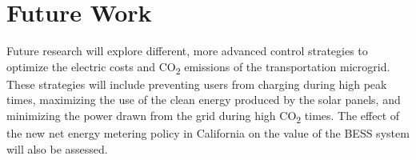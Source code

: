 \documentclass[conference]{IEEEtran}
\begin{document}
	\section{Future Work}
		  Future research will explore different, more advanced control strategies to optimize the electric costs and CO\textsubscript{2} emissions of the transportation microgrid. These strategies will include preventing users from charging during high peak times, maximizing the use of the clean energy produced by the solar panels, and minimizing the power drawn from the grid during high CO\textsubscript{2} times. The effect of the new net energy metering policy in California on the value of the BESS system will also be assessed.
		
		
		
\end{document}
